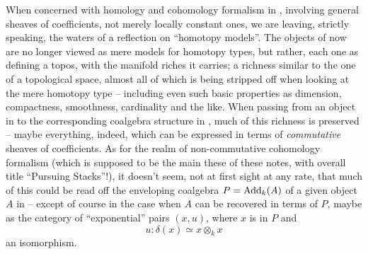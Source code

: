When concerned with homology and cohomology formalism in \Cat,
involving general sheaves of coefficients, not merely locally constant
ones, we are leaving, strictly speaking, the waters of a reflection on
``homotopy models''. The objects of \Cat{} now are no longer viewed as
mere models for homotopy types, but rather, each one as defining a
topos, with the manifold riches it carries; a richness similar to the
one of a topological space, almost all of which is being stripped off
when looking at the mere homotopy type -- including even such basic
properties as dimension, compactness, smoothness, cardinality and the
like. When passing from an object in \Cat{} to the corresponding
coalgebra structure in \Cat, much of this richness is preserved --
maybe everything, indeed, which can be expressed in terms of
\emph{commutative} sheaves of coefficients. As for the realm of
non-commutative cohomology formalism (which is supposed to be the main
these of these notes, with overall title ``Pursuing Stacks''!), it
doesn't seem, not at first sight at any rate, that much of this could
be read off the enveloping coalgebra $P=\operatorname{Add}_k(A)$ of a given object
$A$ in \Cat{} -- except of course in the case when $A$ can be
recovered in terms of $P$, maybe as the category of ``exponential''
pairs $(x,u)$, where $x$ is in $P$ and
\[ u:\delta(x) \simeq x \otimes_k x\]
an isomorphism.

\clearpage

\noindent\hfill{}\par

